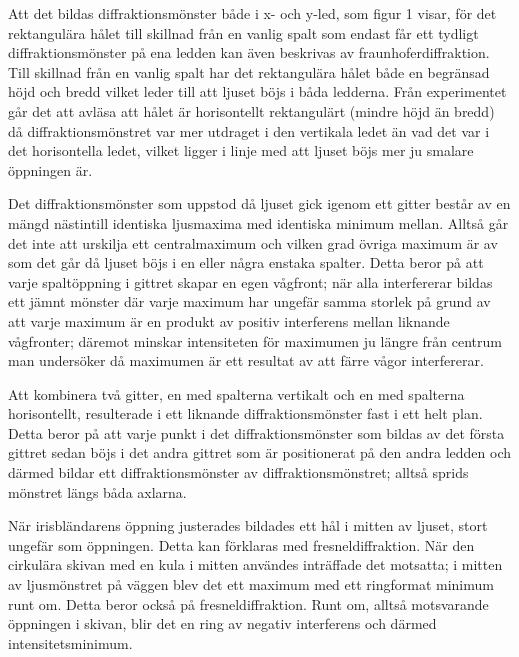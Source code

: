 \documentclass[conference]{IEEEtran}
\begin{document}
Att det bildas diffraktionsmönster både i x- och y-led, som figur 1 visar, för det rektangulära hålet till skillnad från en vanlig spalt som endast får ett tydligt diffraktionsmönster på ena ledden kan även beskrivas av fraunhoferdiffraktion. Till skillnad från en vanlig spalt har det rektangulära hålet både en begränsad höjd och bredd vilket leder till att ljuset böjs i båda ledderna. Från experimentet går det att avläsa att hålet är horisontellt rektangulärt (mindre höjd än bredd) då diffraktionsmönstret var mer utdraget i den vertikala ledet än vad det var i det horisontella ledet, vilket ligger i linje med att ljuset böjs mer ju smalare öppningen är. 

Det diffraktionsmönster som uppstod då ljuset gick igenom ett gitter består av en mängd nästintill identiska ljusmaxima med identiska minimum mellan. Alltså går det inte att urskilja ett centralmaximum och vilken grad övriga maximum är av som det går då ljuset böjs i en eller några enstaka spalter. Detta beror på att varje spaltöppning i gittret skapar en egen vågfront; när alla interfererar bildas ett jämnt mönster där varje maximum har ungefär samma storlek på grund av att varje maximum är en produkt av positiv interferens mellan liknande vågfronter; däremot minskar intensiteten för maximumen ju längre från centrum man undersöker då maximumen är ett resultat av att färre vågor interfererar. 

Att kombinera två gitter, en med spalterna vertikalt och en med spalterna horisontellt, resulterade i ett liknande diffraktionsmönster fast i ett helt plan. Detta beror på att varje punkt i det diffraktionsmönster som bildas av det första gittret sedan böjs i det andra gittret som är positionerat på den andra ledden och därmed bildar ett diffraktionsmönster av diffraktionsmönstret; alltså sprids mönstret längs båda axlarna. 

När irisbländarens öppning justerades bildades ett hål i mitten av ljuset, stort ungefär som öppningen. Detta kan förklaras med fresneldiffraktion.  När den cirkulära skivan med en kula i mitten användes inträffade det motsatta; i mitten av ljusmönstret på väggen blev det ett maximum med ett ringformat minimum runt om. Detta beror också på fresneldiffraktion. Runt om, alltså motsvarande öppningen i skivan, blir det en ring av negativ interferens och därmed intensitetsminimum. 
\end{document}
